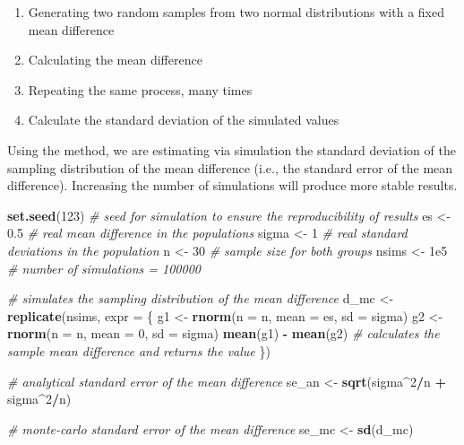 \documentclass[
  man,floatsintext]{apa6}
\newenvironment{Shaded}{\begin{snugshade}}{\end{snugshade}}
\newcommand{\AttributeTok}[1]{\textcolor[rgb]{0.13,0.29,0.53}{#1}}
\newcommand{\CommentTok}[1]{\textcolor[rgb]{0.56,0.35,0.01}{\textit{#1}}}
\newcommand{\DecValTok}[1]{\textcolor[rgb]{0.00,0.00,0.81}{#1}}
\newcommand{\FloatTok}[1]{\textcolor[rgb]{0.00,0.00,0.81}{#1}}
\newcommand{\FunctionTok}[1]{\textcolor[rgb]{0.13,0.29,0.53}{\textbf{#1}}}
\newcommand{\NormalTok}[1]{#1}
\newcommand{\OtherTok}[1]{\textcolor[rgb]{0.56,0.35,0.01}{#1}}
\newcommand{\SpecialCharTok}[1]{\textcolor[rgb]{0.81,0.36,0.00}{\textbf{#1}}}
\providecommand{\tightlist}{%
  \setlength{\itemsep}{0pt}\setlength{\parskip}{0pt}}
\begin{document}
\begin{enumerate}
\def\labelenumi{\arabic{enumi}.}
\tightlist
\item
  Generating two random samples from two normal distributions with a fixed mean difference
\item
  Calculating the mean difference
\item
  Repeating the same process, many times
\item
  Calculate the standard deviation of the simulated values
\end{enumerate}

Using the method, we are estimating via simulation the standard deviation of the sampling distribution of the mean difference (i.e., the standard error of the mean difference). Increasing the number of simulations will produce more stable results.

\scriptsize

\begin{Shaded}
\begin{Highlighting}[]
\FunctionTok{set.seed}\NormalTok{(}\DecValTok{123}\NormalTok{) }\CommentTok{\# seed for simulation to ensure the reproducibility of results}
\NormalTok{es }\OtherTok{\textless{}{-}} \FloatTok{0.5} \CommentTok{\# real mean difference in the populations}
\NormalTok{sigma }\OtherTok{\textless{}{-}} \DecValTok{1} \CommentTok{\# real standard deviations in the population}
\NormalTok{n }\OtherTok{\textless{}{-}} \DecValTok{30} \CommentTok{\# sample size for both groups}
\NormalTok{nsims }\OtherTok{\textless{}{-}} \FloatTok{1e5} \CommentTok{\# number of simulations = 100000}

\CommentTok{\# simulates the sampling distribution of the mean difference}
\NormalTok{d\_mc }\OtherTok{\textless{}{-}} \FunctionTok{replicate}\NormalTok{(nsims, }\AttributeTok{expr =}\NormalTok{ \{}
\NormalTok{  g1 }\OtherTok{\textless{}{-}} \FunctionTok{rnorm}\NormalTok{(}\AttributeTok{n =}\NormalTok{ n, }\AttributeTok{mean =}\NormalTok{ es, }\AttributeTok{sd =}\NormalTok{ sigma)}
\NormalTok{  g2 }\OtherTok{\textless{}{-}} \FunctionTok{rnorm}\NormalTok{(}\AttributeTok{n =}\NormalTok{ n, }\AttributeTok{mean =} \DecValTok{0}\NormalTok{, }\AttributeTok{sd =}\NormalTok{ sigma)}
  \FunctionTok{mean}\NormalTok{(g1) }\SpecialCharTok{{-}} \FunctionTok{mean}\NormalTok{(g2) }\CommentTok{\# calculates the sample mean difference and returns the value}
\NormalTok{\})}

\CommentTok{\# analytical standard error of the mean difference}
\NormalTok{se\_an }\OtherTok{\textless{}{-}} \FunctionTok{sqrt}\NormalTok{(sigma}\SpecialCharTok{\^{}}\DecValTok{2}\SpecialCharTok{/}\NormalTok{n }\SpecialCharTok{+}\NormalTok{ sigma}\SpecialCharTok{\^{}}\DecValTok{2}\SpecialCharTok{/}\NormalTok{n)}

\CommentTok{\# monte{-}carlo standard error of the mean difference}
\NormalTok{se\_mc }\OtherTok{\textless{}{-}} \FunctionTok{sd}\NormalTok{(d\_mc)}
\end{Highlighting}
\end{Shaded}
\end{document}

